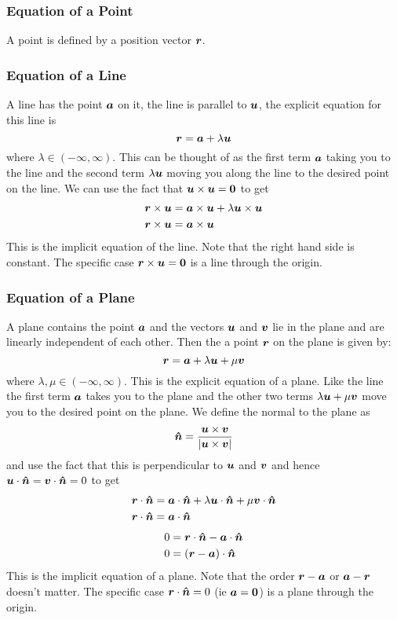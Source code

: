 \documentclass{article}
\begin{document}
    \subsubsection{Equation of a Point}
    A point is defined by a position vector \(\bm{r}\).
    \subsubsection{Equation of a Line}
    A line has the point \(\bm{a}\) on it, the line is parallel to \(\bm{u}\), the explicit equation for this line is
    \[\bm{r} = \bm{a} + \lambda \bm{u}\]
    where \(\lambda \in (-\infty, \infty)\).
    This can be thought of as the first term \(\bm{a}\) taking you to the line and the second term \(\lambda\bm{u}\) moving you along the line to the desired point on the line.
    We can use the fact that \(\bm{u}\times\bm{u} = \bm{0}\) to get
    \begin{align*}
        \bm{r}\times\bm{u} &= \bm{a}\times\bm{u} + \lambda\bm{u}\times\bm{u}\\
        \bm{r}\times\bm{u} &= \bm{a}\times\bm{u}
    \end{align*}
    This is the implicit equation of the line.
    Note that the right hand side is constant.
    The specific case \(\bm{r}\times\bm{u} = \bm{0}\) is a line through the origin.
    
    \subsubsection{Equation of a Plane}
    A plane contains the point \(\bm{a}\) and the vectors \(\bm{u}\) and \(\bm{v}\) lie in the plane and are linearly independent of each other.
    Then the a point \(\bm{r}\) on the plane is given by:
    \[\bm{r} = \bm{a} + \lambda\bm{u} + \mu\bm{v}\]
    where \(\lambda,\mu\in(-\infty,\infty)\).
    This is the explicit equation of a plane.
    Like the line the first term \(\bm{a}\) takes you to the plane and the other two terms \(\lambda\bm{u} + \mu\bm{v}\) move you to the desired point on the plane.
    We define the normal to the plane as
    \[\bm{\hat{n}} = \frac{\bm{u}\times\bm{v}}{|\bm{u}\times\bm{v}|}\]
    and use the fact that this is perpendicular to \(\bm{u}\) and \(\bm{v}\) and hence \(\bm{u}\cdot\bm{\hat{n}} = \bm{v}\cdot\bm{\hat{n}} = 0\) to get
    \begin{align*}
        \bm{r}\cdot\bm{\hat{n}} &= \bm{a}\cdot\bm{\hat{n}} + \lambda\bm{u}\cdot\bm{\hat{n}} + \mu\bm{v}\cdot\bm{\hat{n}}\\
        \bm{r}\cdot\bm{\hat{n}} &= \bm{a}\cdot\bm{\hat{n}}\\
    \end{align*}
    \begin{align*}
        0 &= \bm{r}\cdot\bm{\hat{n}} - \bm{a}\cdot\bm{\hat{n}}\\
        0 &= (\bm{r} - \bm{a})\cdot\bm{\hat{n}}\\
    \end{align*}
    This is the implicit equation of a plane.
    Note that the order \(\bm{r} - \bm{a}\) or \(\bm{a} - \bm{r}\) doesn't matter.
    The specific case \(\bm{r}\cdot\bm{\hat{n}} = 0\) (ie \(\bm{a} = \bm{0}\)) is a plane through the origin.
    
\end{document}
